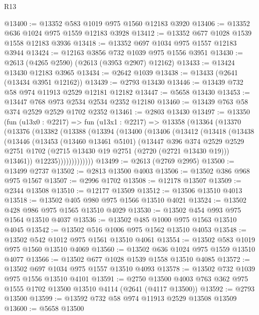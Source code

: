 \begin{lexlean}{R13}
\begin{coremodule}
@13400 := @13352 @583 @1019 @975 @1560 @12183 @3920
@13406 := @13352 @636 @1024 @975 @1559 @12183 @3928
@13412 := @13352 @677 @1028 @1539 @1558 @12183 @3936
@13418 := @13352 @697 @1034 @975 @1557 @12183 @3944
@13424 := @12163 @3856 @732 @1039 @975 @1556 @3951
@13430 := @2613 (@4265 @2590) (@2613 (@3953 @2907) @12162)
@13433 := @13424 @13430 @12183 @3965
@13434 := @2642 @1039
@13438 := @13433 (@2641 (@13434 @3951 @12162))
@13439 := @2793 @13430
@13446 := @13439 @732 @58 @974 @11913 @2529 @12181 @12182
@13447 := @5658 @13430
@13453 := @13447 @768 @973 @2534 @2534 @2352 @12180
@13460 := @13439 @763 @58 @374 @2529 @2529 @1702 @2352
@13461 := @2803 @13430
@13497 := @13350
    (fun (u13x0 : @2217) =>
    fun (u13x1 : @2217) =>
    @13358
      (@13364
        (@13370
          (@13376
            (@13382
              (@13388
                (@13394
                  (@13400
                    (@13406
                      (@13412
                        (@13418
                          (@13438
                            (@13446
                              (@13453
                                (@13460 @13461 @5101)
                                (@13447
                                  @396
                                  @374
                                  @2529
                                  @2529
                                  @2751
                                  @1702
                                  (@2715 @13430 @19 @2751 (@2720 (@2721 @13430 @19)))
                                  @13461))
                              @12235)))))))))))))
@13499 := @2613 (@2769 @2995)
@13500 := @13499 @2737
@13502 := @2813 @13500 @4003
@13506 := @13502 @386 @968 @975 @1567
@13507 := @2996 @1702
@13508 := @12178 @13507
@13509 := @2344 @13508
@13510 := @12177 @13509
@13512 := @13506 @13510 @4013
@13518 := @13502 @405 @980 @975 @1566 @13510 @4021
@13524 := @13502 @428 @986 @975 @1565 @13510 @4029
@13530 := @13502 @454 @993 @975 @1564 @13510 @4037
@13536 := @13502 @485 @1000 @975 @1563 @13510 @4045
@13542 := @13502 @516 @1006 @975 @1562 @13510 @4053
@13548 := @13502 @542 @1012 @975 @1561 @13510 @4061
@13554 := @13502 @583 @1019 @975 @1560 @13510 @4069
@13560 := @13502 @636 @1024 @975 @1559 @13510 @4077
@13566 := @13502 @677 @1028 @1539 @1558 @13510 @4085
@13572 := @13502 @697 @1034 @975 @1557 @13510 @4093
@13578 := @13502 @732 @1039 @975 @1556 @13510 @4101
@13591 := @2750 @13500 @4003 @763 @362 @975 @1555 @1702 @13500 @13510 @4114 (@2641 (@4117 @13500))
@13592 := @2793 @13500
@13599 := @13592 @732 @58 @974 @11913 @2529 @13508 @13509
@13600 := @5658 @13500

\end{coremodule}
\end{lexlean}

